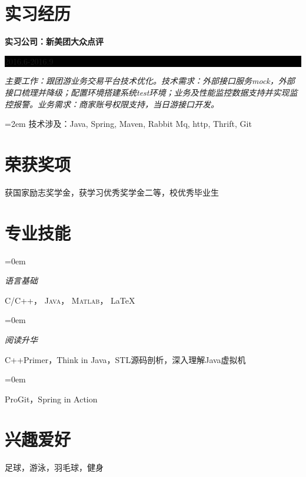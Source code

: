 \documentclass[paper=a4,fontsize=11pt]{scrartcl} %
\newlength{\spacebox}
\newcommand{\NewPart}[1]{\section*{\uppercase{#1}}}
\newcommand{\PersonalEntry}[2]{
		\hfill %
		\textit{#1}		       %
		#2 \par}    %
\newcommand{\SkillsEntry}[2]{      %
		\noindent\hangindent=0em\hangafter=0 %
		\parbox{\spacebox}{        %
		\textit{#1}}			   %
		\hspace{1.5em} #2 \par}    %
\newcommand{\EducationEntry}[4]{
		\noindent \textbf{#1} \hfill      %
		\colorbox{Black}{%
			\parbox{6em}{%
			\hfill\color{White}#2}} \par  %
		\noindent \textit{#3} \par        %
		\noindent\hangindent=2em\hangafter=0 \small #4 %
		\normalsize \par}
\begin{document}
\begin{CJK}{UTF8}{gbsn}
\NewPart{实习经历}{}
\EducationEntry{实习公司：新美团大众点评}{2016.6-2016.9}{主要工作：跟团游业务交易平台技术优化。技术需求：外部接口服务mock，外部接口梳理并降级；配置环境搭建系统test环境；业务及性能监控数据支持并实现监控报警。业务需求：商家账号权限支持，当日游接口开发。}{技术涉及：Java, Spring, Maven, Rabbit Mq, http, Thrift, Git}

\vspace*{-0.2cm}

\NewPart{荣获奖项}{}
获国家励志奖学金，获学习优秀奖学金二等，校优秀毕业生

\vspace*{-0.2cm}
\NewPart{专业技能}{}

\SkillsEntry{语言基础}{\textsc{C/C++}， \textsc{Java}， \textsc{Matlab}， \LaTeX}
\SkillsEntry{阅读升华}{C++Primer，Think in Java，STL源码剖析，深入理解Java虚拟机}
\SkillsEntry{}{ProGit，Spring in Action}

\vspace*{-0.4cm}
\NewPart{兴趣爱好}{}
足球，游泳，羽毛球，健身


\end{CJK}
\end{document}
